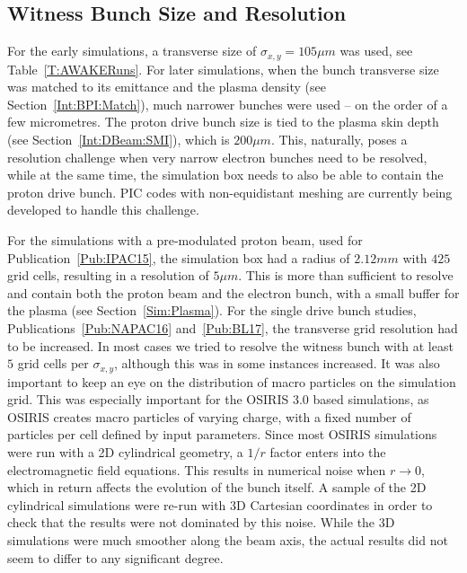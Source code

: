 \subsection{Witness Bunch Size and Resolution}
\label{Sim:EBeam:SizeRes}

For the early simulations, a transverse size of $\sigma_{x,y}=105\unit{\mu m}$ was used, see Table~\ref{T:AWAKERuns}.
For later simulations, when the bunch transverse size was matched to its emittance and the plasma density (see Section~\ref{Int:BPI:Match}), much narrower bunches were used -- on the order of a few micrometres.
The proton drive bunch size is tied to the plasma skin depth (see Section~\ref{Int:DBeam:SMI}), which is $200\unit{\mu m}$.
This, naturally, poses a resolution challenge when very narrow electron bunches need to be resolved, while at the same time, the simulation box needs to also be able to contain the proton drive bunch.
PIC codes with non-equidistant meshing are currently being developed to handle this challenge.

For the simulations with a pre-modulated proton beam, used for Publication~\ref{Pub:IPAC15}, the simulation box had a radius of $2.12\unit{mm}$ with $425$ grid cells, resulting in a resolution of $5\unit{\mu m}$.
This is more than sufficient to resolve and contain both the proton beam and the electron bunch, with a small buffer for the plasma (see Section~\ref{Sim:Plasma}).
For the single drive bunch studies, Publications~\ref{Pub:NAPAC16} and~\ref{Pub:BL17}, the transverse grid resolution had to be increased.
In most cases we tried to resolve the witness bunch with at least $5$ grid cells per $\sigma_{x,y}$, although this was in some instances increased.
It was also important to keep an eye on the distribution of macro particles on the simulation grid.
This was especially important for the OSIRIS 3.0 based simulations, as OSIRIS creates macro particles of varying charge, with a fixed number of particles per cell defined by input parameters.
Since most OSIRIS simulations were run with a 2D cylindrical geometry, a $1/r$ factor enters into the electromagnetic field equations.
This results in numerical noise when $r \to 0$, which in return affects the evolution of the bunch itself.
A sample of the 2D cylindrical simulations were re-run with 3D Cartesian coordinates in order to check that the results were not dominated by this noise.
While the 3D simulations were much smoother along the beam axis, the actual results did not seem to differ to any significant degree.

